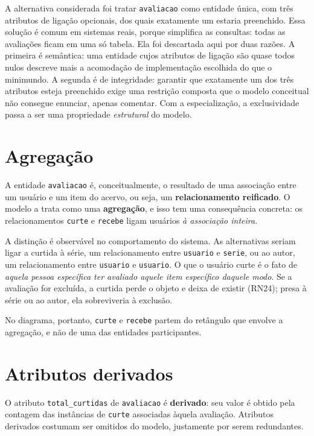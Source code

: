 \documentclass[a4paper,12pt,oneside,openany]{book}
\newcommand{\id}[1]{\texttt{#1}}
\begin{document}
A alternativa considerada foi tratar \id{avaliacao} como entidade única, com três
atributos de ligação opcionais, dos quais exatamente um estaria preenchido. Essa
solução é comum em sistemas reais, porque simplifica as consultas: todas as
avaliações ficam em uma só tabela. Ela foi
descartada aqui por duas razões. A primeira é semântica: uma entidade cujos
atributos de ligação são quase todos nulos descreve mais a acomodação de
implementação escolhida do que o minimundo. A segunda é de integridade:
garantir que exatamente um dos três atributos esteja preenchido exige uma restrição
composta que o modelo conceitual não consegue enunciar, apenas comentar. Com a
especialização, a exclusividade passa a ser uma propriedade \emph{estrutural} do
modelo.

\section{Agregação}\label{sec:agregacao}

A entidade \id{avaliacao} é, conceitualmente, o resultado de uma associação entre um
usuário e um item do acervo, ou seja, um \textbf{relacionamento reificado}. O modelo
a trata como uma \textbf{agregação}, e isso tem uma consequência concreta: os
relacionamentos \id{curte} e \id{recebe} ligam usuários \emph{à associação inteira}.

A distinção é observável no comportamento do sistema. As alternativas seriam ligar a
curtida à série, um relacionamento entre \id{usuario} e \id{serie}, ou ao autor, um
relacionamento entre \id{usuario} e \id{usuario}. O que o usuário curte é o fato de
\emph{aquela pessoa específica ter avaliado aquele item específico daquele modo}. Se
a avaliação for excluída, a curtida perde o objeto e deixa de existir (RN24); presa
à série ou ao autor, ela sobreviveria à exclusão.

No diagrama, portanto, \id{curte} e \id{recebe} partem do retângulo que envolve a
agregação, e não de uma das entidades participantes.

\section{Atributos derivados}\label{sec:derivados}

O atributo \id{total\_curtidas} de \id{avaliacao} é \textbf{derivado}: seu valor é
obtido pela contagem das instâncias de \id{curte} associadas àquela avaliação.
Atributos derivados costumam ser omitidos do modelo, justamente por serem
redundantes.
\end{document}
